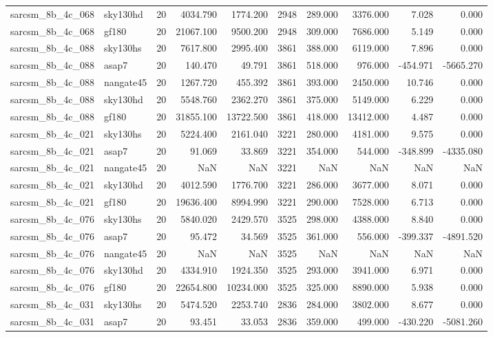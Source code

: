 \begin{longtable}{llrrrrrrrr}
sarcsm\_8b\_4c\_068 & sky130hd & 20 & 4034.790 & 1774.200 & 2948 & 289.000 & 3376.000 & 7.028 & 0.000 \\
sarcsm\_8b\_4c\_068 & gf180 & 20 & 21067.100 & 9500.200 & 2948 & 309.000 & 7686.000 & 5.149 & 0.000 \\
sarcsm\_8b\_4c\_088 & sky130hs & 20 & 7617.800 & 2995.400 & 3861 & 388.000 & 6119.000 & 7.896 & 0.000 \\
sarcsm\_8b\_4c\_088 & asap7 & 20 & 140.470 & 49.791 & 3861 & 518.000 & 976.000 & -454.971 & -5665.270 \\
sarcsm\_8b\_4c\_088 & nangate45 & 20 & 1267.720 & 455.392 & 3861 & 393.000 & 2450.000 & 10.746 & 0.000 \\
sarcsm\_8b\_4c\_088 & sky130hd & 20 & 5548.760 & 2362.270 & 3861 & 375.000 & 5149.000 & 6.229 & 0.000 \\
sarcsm\_8b\_4c\_088 & gf180 & 20 & 31855.100 & 13722.500 & 3861 & 418.000 & 13412.000 & 4.487 & 0.000 \\
sarcsm\_8b\_4c\_021 & sky130hs & 20 & 5224.400 & 2161.040 & 3221 & 280.000 & 4181.000 & 9.575 & 0.000 \\
sarcsm\_8b\_4c\_021 & asap7 & 20 & 91.069 & 33.869 & 3221 & 354.000 & 544.000 & -348.899 & -4335.080 \\
sarcsm\_8b\_4c\_021 & nangate45 & 20 & NaN & NaN & 3221 & NaN & NaN & NaN & NaN \\
sarcsm\_8b\_4c\_021 & sky130hd & 20 & 4012.590 & 1776.700 & 3221 & 286.000 & 3677.000 & 8.071 & 0.000 \\
sarcsm\_8b\_4c\_021 & gf180 & 20 & 19636.400 & 8994.990 & 3221 & 290.000 & 7528.000 & 6.713 & 0.000 \\
sarcsm\_8b\_4c\_076 & sky130hs & 20 & 5840.020 & 2429.570 & 3525 & 298.000 & 4388.000 & 8.840 & 0.000 \\
sarcsm\_8b\_4c\_076 & asap7 & 20 & 95.472 & 34.569 & 3525 & 361.000 & 556.000 & -399.337 & -4891.520 \\
sarcsm\_8b\_4c\_076 & nangate45 & 20 & NaN & NaN & 3525 & NaN & NaN & NaN & NaN \\
sarcsm\_8b\_4c\_076 & sky130hd & 20 & 4334.910 & 1924.350 & 3525 & 293.000 & 3941.000 & 6.971 & 0.000 \\
sarcsm\_8b\_4c\_076 & gf180 & 20 & 22654.800 & 10234.000 & 3525 & 325.000 & 8890.000 & 5.938 & 0.000 \\
sarcsm\_8b\_4c\_031 & sky130hs & 20 & 5474.520 & 2253.740 & 2836 & 284.000 & 3802.000 & 8.677 & 0.000 \\
sarcsm\_8b\_4c\_031 & asap7 & 20 & 93.451 & 33.053 & 2836 & 359.000 & 499.000 & -430.220 & -5081.260 \\

\end{longtable}
